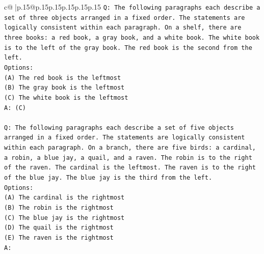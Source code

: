 \documentclass{article}
\begin{document}
{\begin{supertabular}{c@{$\;$}|p{.15\linewidth}@{}p{.15\linewidth}p{.15\linewidth}p{.15\linewidth}p{.15\linewidth}p{.15\linewidth}}
{{{\texttt{Q: The following paragraphs each describe a set of three objects arranged in a fixed order. The statements are logically consistent within each paragraph. On a shelf, there are three books: a red book, a gray book, and a white book. The white book is to the left of the gray book. The red book is the second from the left.} \\
\texttt{Options:} \\
\texttt{(A) The red book is the leftmost} \\
\texttt{(B) The gray book is the leftmost} \\
\texttt{(C) The white book is the leftmost} \\
\texttt{A: (C)} \\
\\ 
\texttt{Q: The following paragraphs each describe a set of five objects arranged in a fixed order. The statements are logically consistent within each paragraph. On a branch, there are five birds: a cardinal, a robin, a blue jay, a quail, and a raven. The robin is to the right of the raven. The cardinal is the leftmost. The raven is to the right of the blue jay. The blue jay is the third from the left.} \\
\texttt{Options:} \\
\texttt{(A) The cardinal is the rightmost} \\
\texttt{(B) The robin is the rightmost} \\
\texttt{(C) The blue jay is the rightmost} \\
\texttt{(D) The quail is the rightmost} \\
\texttt{(E) The raven is the rightmost} \\
\texttt{A:} \\
            }
        }
    }
     \\ \\


\end{supertabular}}
\end{document}
